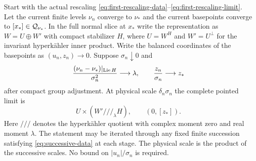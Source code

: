 \begin{theorem}\label{thm:successive-limits}
Start with the actual rescaling
\eqref{eq:first-rescaling-data}--\eqref{eq:first-rescaling-limit}.
Let the current finite levels $\nu_n$ converge
to $\nu_*$ and the current basepoints converge
to $[x_*]\in\mathcal Q_{\nu_*}$. In the full normal
slice at $x_*$ write the representation as
$W=U\oplus W'$ with compact stabilizer $H$,
where $U=W^H$ and $W'=U^\perp$ for the invariant
hyperk\"ahler inner product. Write the
balanced coordinates of the basepoints as
$(u_n,z_n)\to0$. Suppose $\sigma_n\downarrow0$ and
\begin{equation}\label{eq:successive-data}
 \frac{(\nu_n-\nu_*)|_{\operatorname{Lie} H}}{\sigma_n^2}
       \longrightarrow\lambda,
 \qquad \frac{z_n}{\sigma_n}\longrightarrow z_*
\end{equation}
after compact group adjustment. At physical
scale $\delta_n\sigma_n$ the complete pointed
limit is
\begin{equation}\label{eq:successive-product}
 U\times(W'///_\lambda H),\qquad (0,[z_*]).
\end{equation}
Here $///$ denotes the hyperk\"ahler quotient
with complex moment zero and real moment
$\lambda$. The statement may be iterated
through any fixed finite succession satisfying
\eqref{eq:successive-data} at each stage.
The physical scale is the product of the
successive scales. No bound on $|u_n|/\sigma_n$
is required.
\end{theorem}


